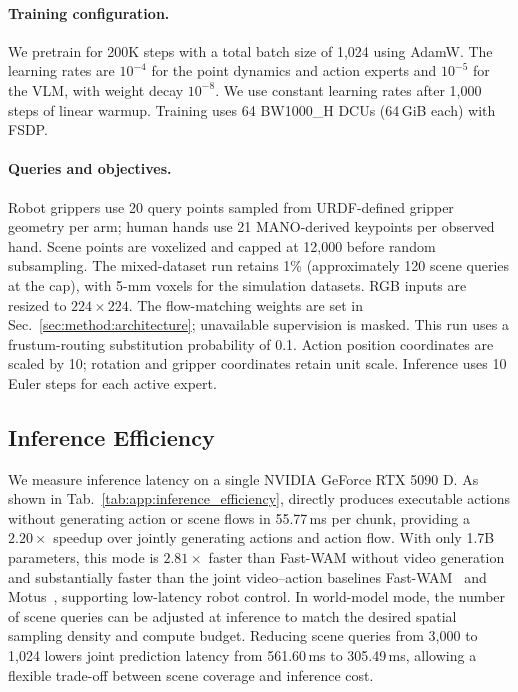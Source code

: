 \paragraph{Training configuration.}
We pretrain for 200K steps with a total batch size of 1,024 using AdamW.
The learning rates are $10^{-4}$ for the point dynamics and action experts and
$10^{-5}$ for the VLM, with weight decay $10^{-8}$.
We use constant learning rates after 1,000 steps of linear warmup.
Training uses 64 BW1000\_H DCUs (64\,GiB each) with FSDP.

\paragraph{Queries and objectives.}
Robot grippers use 20 query points sampled from URDF-defined gripper geometry
per arm; human hands use 21 MANO-derived keypoints per observed hand.
Scene points are voxelized and capped at 12,000 before random
subsampling. The mixed-dataset run retains 1\% (approximately 120 scene
queries at the cap), with 5-mm voxels for the simulation datasets.
RGB inputs are resized to $224\!\times\!224$.
The flow-matching weights are set in
Sec.~\ref{sec:method:architecture}; unavailable supervision is masked.
This run uses a frustum-routing substitution probability of 0.1. Action position coordinates are scaled by 10; rotation and gripper
coordinates retain unit scale. Inference uses 10 Euler steps for each
active expert.


\subsection{Inference Efficiency}
\label{app:inference_efficiency}

We measure inference latency on a single NVIDIA GeForce RTX 5090 D.
As shown in Tab.~\ref{tab:app:inference_efficiency}, \method{} directly
produces executable actions without generating action or scene flows
in 55.77\,ms per chunk, providing a $2.20\times$ speedup over jointly
generating actions and action flow. With only 1.7B parameters, this mode
is $2.81\times$ faster than Fast-WAM without video generation and
substantially faster than the joint video--action baselines
Fast-WAM~\citep{yuan2026fastwam} and Motus~\citep{bi2025motus},
supporting low-latency robot control. In world-model mode, the number
of scene queries can be adjusted at inference to match the desired
spatial sampling density and compute budget. Reducing scene queries
from 3,000 to 1,024 lowers joint prediction latency from 561.60\,ms
to 305.49\,ms, allowing a flexible trade-off between scene coverage
and inference cost.



